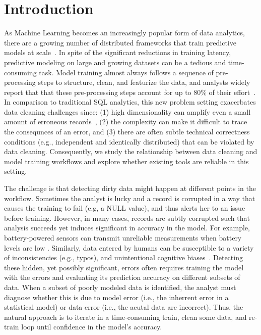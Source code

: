 \section{Introduction}
As Machine Learning becomes an increasingly popular form of data analytics, there are a growing number of distributed frameworks that train predictive models at scale~\cite{bdas, alexandrov2014stratosphere, crotty2014tupleware, tensor}.
In spite of the significant reductions in training latency, predictive modeling on large and growing datasets can be a tedious and time-consuming task.  
Model training almost always follows a sequence of pre-processing steps to structure, clean, and featurize the data, and analysts widely report that that these pre-processing steps account for up to 80\% of their effort~\cite{nytimes, kandel2012}.
In comparison to traditional SQL analytics, this new problem setting exacerbates data cleaning challenges since: (1) high dimensionality can amplify even a small amount of erroneous records~\cite{xiaofeature}, (2) the complexity can make it difficult to trace the consequnces of an error, and (3) there are often subtle technical correctness conditions (e.g., independent and identically distributed) that can be violated by data cleaning.
Consequently, we study the relationship between data cleaning and model training workflows and explore whether existing tools are reliable in this setting.

The challenge is that detecting dirty data might happen at different points in the workflow.
Sometimes the analyst is lucky and a record is corrupted in a way that causes the training to fail (e.g, a NULL value), and thus alerts her to an issue before training.
However, in many cases, records are subtly corrupted such that analysis succeeds yet induces significant in accuracy in the model.
For example, battery-powered sensors can transmit unreliable measurements when battery levels are low \cite{DBLP:conf/pervasive/JefferyAFHW06}. 
Similarly, data entered by humans can be susceptible to a variety of inconsistencies (e.g., typos), and unintentional cognitive biases~\cite{DBLP:conf/recsys/KrishnanPFG14}.
Detecting these hidden, yet possibly significant, errors often requires training the model with the errors and evaluating its prediction accuracy on different subsets of data. 
When a subset of poorly modeled data is identified, the analyst must diagnose whether this is due to model error (i.e., the inherrent error in a statistical model) or data error (i.e., the acutal data are incorrect).
Thus, the natural approach is to iterate in a time-consuming train, clean some data, and re-train loop until confidence in the model's accuracy.

